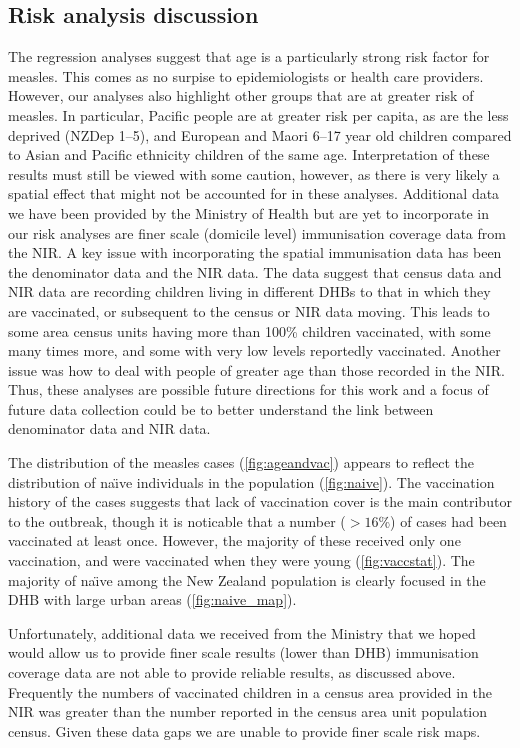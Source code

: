 \documentclass{article}
\begin{document}
\subsection*{Risk analysis discussion}

The regression analyses suggest that age is a particularly strong risk factor for measles. This comes as no surpise to epidemiologists or health care providers. However, our analyses also highlight other groups that are at greater risk of measles. In particular, Pacific people are at greater risk per capita, as are the less deprived (NZDep 1--5), and European and Maori 6--17 year old children compared to Asian and Pacific ethnicity children of the same age. Interpretation of these results must still be viewed with some caution, however, as there is very likely a spatial effect that might not be accounted for in these analyses. Additional data we have been provided by the Ministry of Health but are yet to incorporate in our risk analyses are finer scale (domicile level) immunisation coverage data from the NIR. A key issue with incorporating the spatial immunisation data has been the denominator data and the NIR data. The data suggest that census data and NIR data are recording children living in different DHBs to that in which they are vaccinated, or subsequent to the census or NIR data moving. This leads to some area census units having more than 100\% children vaccinated, with some many times more, and some with very low levels reportedly vaccinated. Another issue was how to deal with people of greater age than those recorded in the NIR. Thus, these analyses are possible future directions for this work and a focus of future data collection could be to better understand the link between denominator data and NIR data. 

The distribution of the measles cases (\autoref{fig:ageandvac}) appears to reflect the distribution of na\"{\i}ve individuals in the population (\autoref{fig:naive}). The vaccination history of the cases suggests that lack of vaccination cover is the main contributor to the outbreak, though it is noticable that a number ($>16\%$) of cases had been vaccinated at least once. However, the majority of these received only one vaccination, and were vaccinated when they were young (\autoref{fig:vaccstat}). The majority of na\"{\i}ve among the New Zealand population is clearly focused in the DHB with large urban areas (\autoref{fig:naive_map}). 

Unfortunately, additional data we received from the Ministry that we hoped would allow us to provide finer scale results (lower than DHB) immunisation coverage data are not able to provide reliable results, as discussed above. Frequently the numbers of vaccinated children in a census area provided in the NIR was greater than the number reported in the census area unit population census. Given these data gaps we are unable to provide finer scale risk maps.
\end{document}
